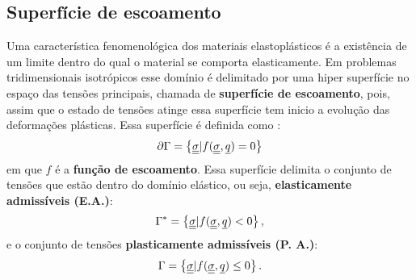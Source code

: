 \subsection{Superfície de escoamento}
Uma característica fenomenológica dos materiais elastoplásticos é a existência de um limite dentro do qual o material se comporta elasticamente. Em problemas tridimensionais isotrópicos esse domínio é delimitado por uma hiper superfície no espaço das tensões principais, chamada de \textbf{superfície de escoamento}, pois, assim que o estado de tensões atinge essa superfície tem inicio a evolução das deformações plásticas. Essa superfície é definida como \cite[p. 150]{Neto2008}:
\begin{equation}
	\label{eq:superficie_escoamento}
	\partial \Gamma = \left\{ \underline{\underline \sigma} | f(\underline{\underline \sigma},\underline q) = 0 \right\}
\end{equation}
em que $f$ é a \textbf{função de escoamento}. Essa superfície delimita o conjunto de tensões que estão dentro do domínio elástico, ou seja, \textbf{elasticamente admissíveis (E.A.)}:
\begin{equation}
	\label{eq:dominio_elasticamente_admissivel}
	\Gamma^* = \left\{ \underline{\underline \sigma} | f(\underline{\underline \sigma},\underline q) < 0 \right\},
\end{equation}
e o conjunto de tensões \textbf{plasticamente admissíveis (P. A.)}:
\begin{equation}
	\label{eq:dominio_plasticamente_admissivel}
	\Gamma = \left\{ \underline{\underline \sigma} | f(\underline{\underline \sigma},\underline q) \le 0 \right\}.
\end{equation}

